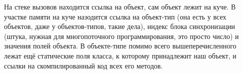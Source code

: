 \documentclass[a5paper]{article}
\begin{document}
На стеке вызовов находится ссылка на объект, сам объект лежит на куче. В участке памяти на куче назодится ссылка на объект-тип (она есть у всех объектов, даже у объектов-типов, такие дела), индекс блока синхронизации (штука, нужная для многопоточного программирования, это просто число) и значения полей объекта. В объекте-типе помимо всего вышеперечисленного лежат ещё статические поля класса, к которому принадлежит наш объект, и ссылки на скомпилированный код всех его методов.
\end{document}
